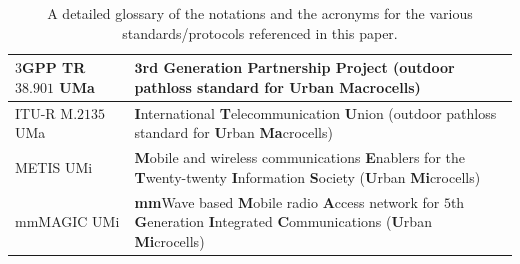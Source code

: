 \documentclass[10pt, twocolumn]{IEEEtran}
\begin{document}
\begin{table} [tb]
\begin{tabular}{|l||l|}
        \hline
        \hline
        $3$GPP TR$38.901$ UMa & $\mathbf{3}$rd \textbf{G}eneration \textbf{P}artnership \textbf{P}roject (outdoor pathloss standard for \textbf{U}rban \textbf{Ma}crocells)\\
		\hline
		ITU-R M$.2135$ UMa & \textbf{I}nternational \textbf{T}elecommunication \textbf{U}nion (outdoor pathloss standard for \textbf{U}rban \textbf{Ma}crocells)\\
		\hline
        METIS UMi & \textbf{M}obile and wireless communications \textbf{E}nablers for the \textbf{T}wenty-twenty \textbf{I}nformation \textbf{S}ociety (\textbf{U}rban \textbf{Mi}crocells)\\
        \hline
        mmMAGIC UMi & \textbf{mm}Wave based \textbf{M}obile radio \textbf{A}ccess network for $5$th \textbf{G}eneration \textbf{I}ntegrated \textbf{C}ommunications (\textbf{U}rban \textbf{Mi}crocells)\\
        \hline
	\end{tabular}
	\vspace{-1mm}
	\caption{A detailed glossary of the notations and the acronyms for the various standards/protocols referenced in this paper.}
	\label{T1}
\end{table}
\end{document}
